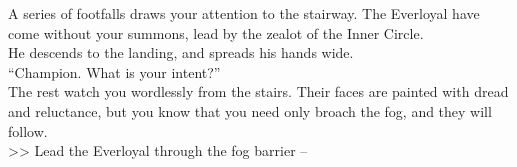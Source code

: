 A series of footfalls draws your attention to the stairway. The Everloyal have come without your summons, lead by the zealot of the Inner Circle.\\

He descends to the landing, and spreads his hands wide.\\
“Champion. What is your intent?”\\

The rest watch you wordlessly from the stairs. Their faces are painted with dread and reluctance, but you know that you need only broach the fog, and they will follow.\\

>> Lead the Everloyal through the fog barrier -- 